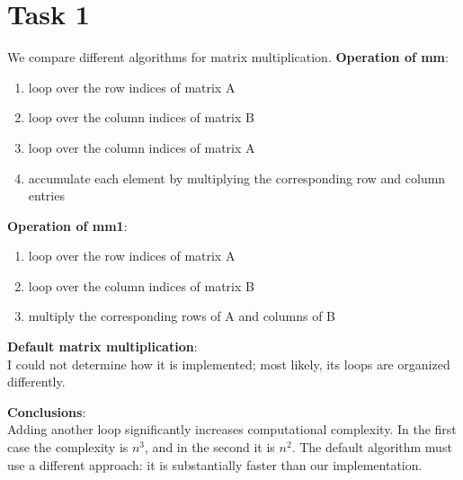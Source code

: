\section{Task 1}
We compare different algorithms for matrix multiplication.
\textbf{Operation of mm}:
\begin{enumerate}
    \item loop over the row indices of matrix A
    \item loop over the column indices of matrix B
    \item loop over the column indices of matrix A
    \item accumulate each element by multiplying the corresponding row and column entries
\end{enumerate}
\textbf{Operation of mm1}:
\begin{enumerate}
    \item loop over the row indices of matrix A
    \item loop over the column indices of matrix B
    \item multiply the corresponding rows of A and columns of B
\end{enumerate}
\textbf{Default matrix multiplication}:\\
I could not determine how it is implemented; most likely, its loops are organized differently.\\

\begin{center}
\end{center}


\noindent 
\textbf{Conclusions}:\\ Adding another loop significantly increases computational complexity. In the first case the complexity is $n^3$, and in the second it is $n^2$. The default algorithm must use a different approach: it is substantially faster than our implementation.
